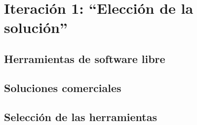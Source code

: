 \chapter{Iteración 1: “Elección de la solución”}
    \section{Herramientas de software libre}
    \section{Soluciones comerciales}
    \section{Selección de las herramientas}